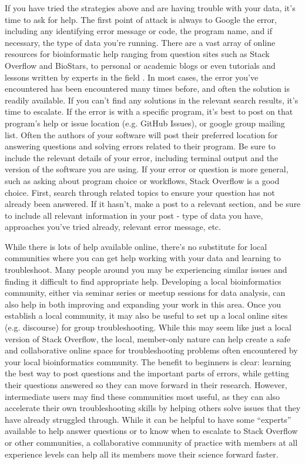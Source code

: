 \documentclass[10pt,letterpaper]{article}
\begin{document}
If you have tried the strategies above and are having trouble with your data, it’s time to ask for help. 
The first point of attack is always to Google the error, including any identifying error message or code, the program name, and if necessary, the type of data you’re running. 
There are a vast array of online resources for bioinformatic help ranging from question sites such as Stack Overflow and BioStars, to personal or academic blogs or even tutorials and lessons written by experts in the field \cite{parnell2011biostar}. 
In most cases, the error you’ve encountered has been encountered many times before, and often the solution is readily available. 
If you can’t find any solutions in the relevant search results, it’s time to escalate. 
If the error is with a specific program, it’s best to post on that program’s help or issue location (e.g. GitHub Issues), or google group mailing list. 
Often the authors of your software will post their preferred location for answering questions and solving errors related to their program. 
Be sure to include the relevant details of your error, including terminal output and the version of the software you are using.
 If your error or question is more general, such as asking about program choice or workflows, Stack Overflow is a good choice. 
First, search through related topics to ensure your question has not already been answered. 
If it hasn’t, make a post to a relevant section, and be sure to include all relevant information in your post - type of data you have, approaches you’ve tried already, relevant error message, etc. 

While there is lots of help available online, there’s no substitute for local communities where you can get help working with your data and learning to troubleshoot. 
Many people around you may be experiencing similar issues and finding it difficult to find appropriate help. 
Developing a local bioinformatics community, either via seminar series or meetup sessions for data analysis, can also help in both improving and expanding your work in this area. 
Once you establish a local community, it may also be useful to set up a local online sites (e.g. discourse) for group troubleshooting. 
While this may seem like just a local version of Stack Overflow, the local, member-only nature can help create a safe and collaborative online space for troubleshooting problems often encountered by your local bioinformatics community. 
The benefit to beginners is clear: learning the best way to post questions and the important parts of errors, while getting their questions answered so they can move forward in their research. 
However, intermediate users may find these communities most useful, as they can also accelerate their own troubleshooting skills by helping others solve issues that they have already struggled through. 
While it can be helpful to have some “experts” available to help answer questions or to know when to escalate to Stack Overflow or other communities, a collaborative community of practice with members at all experience levels can help all its members move their science forward faster.
\end{document}
